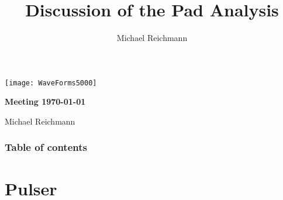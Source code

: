 \documentclass[9pt]{beamer}
\title[Analysis]{Discussion of the Pad Analysis}
\author[M. Reichmann]{Michael Reichmann}
\institute[\textbf{\textit{ETH}}\scalebox{.6}{\textit{Z\"{u}rich}}]{Swiss Federal Institute of Technology Zurich}
\begin{document}
\begin{frame}
	\begin{center}
		\texttt{[image: WaveForms5000]}
	\end{center}
	\begin{alertblock}{
		\begin{center}
			\textbf{Meeting \today}
		\end{center}}
		\vspace*{10pt}
		\begin{center}\small
		Michael Reichmann
		\end{center}\normalsize
	\end{alertblock}
\end{frame}
\begin{frame}[allowframebreaks]
	\frametitle{Table of contents}
	\tableofcontents   %
\end{frame}
\section{Pulser}
\end{document}
